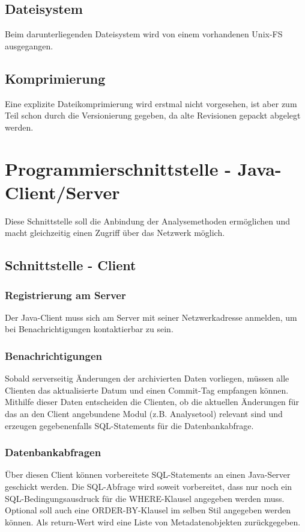 \subsection{Dateisystem} \label{spec:req:archive:fs}
	Beim darunterliegenden Dateisystem wird von einem vorhandenen Unix-FS ausgegangen.
\subsection{Komprimierung} \label{spec:req:archive:comp}
	Eine explizite Dateikomprimierung wird erstmal nicht vorgesehen, ist aber zum Teil schon durch die Versionierung gegeben, da alte Revisionen gepackt abgelegt werden.

\section{Programmierschnittstelle - Java-Client/Server}\label{spec:req:jcs}
	Diese Schnittstelle soll die Anbindung der Analysemethoden ermöglichen und macht gleichzeitig einen Zugriff über das Netzwerk möglich.
\subsection{Schnittstelle - Client}\label{spec:req:jcs:client}
	\subsubsection{Registrierung am Server} \label{spec:req:jcs:client:register}
		Der Java-Client muss sich am Server mit seiner Netzwerkadresse anmelden, um bei Benachrichtigungen kontaktierbar zu sein. %
	\subsubsection{Benachrichtigungen} \label{spec:req:jcs:client:notify}
		Sobald serverseitig Änderungen der archivierten Daten vorliegen, müssen alle Clienten das aktualisierte Datum und einen Commit-Tag empfangen können.
		Mithilfe dieser Daten entscheiden die Clienten, ob die aktuellen Änderungen für das an den Client angebundene Modul (z.B. Analysetool) relevant sind und erzeugen gegebenenfalls SQL-Statements für die Datenbankabfrage.
	\subsubsection{Datenbankabfragen} \label{spec:req:jcs:client:dbquery}
		Über diesen Client können vorbereitete SQL-Statements an einen Java-Server geschickt werden. 
		Die SQL-Abfrage wird soweit vorbereitet, dass nur noch ein SQL-Bedingungsausdruck für die WHERE-Klausel angegeben werden muss.
		Optional soll auch eine ORDER-BY-Klausel im selben Stil angegeben werden können. 
		Als return-Wert wird eine Liste von Metadatenobjekten zurückgegeben.
